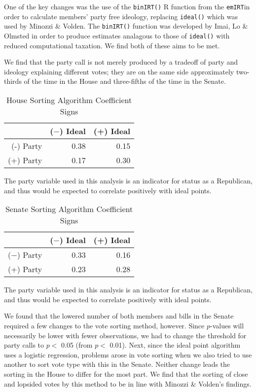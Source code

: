 \documentclass[12pt]{article}
\newcommand\fnote[1]{\captionsetup{font=small}\caption*{#1}}
\begin{document}
One of the key changes was the use of the \verb|binIRT()| R function from the \verb|emIRT|in order to calculate members' party free ideology, replacing \verb|ideal()| which was used by Minozzi \& Volden. The \verb|binIRT()| function was developed by Imai, Lo \& Olmsted in order to produce estimates analagous to those of \verb|ideal()| with reduced computational taxation. We find both of these aims to be met.

We find that the party call is not merely produced by a tradeoff of party and ideology explaining different votes; they are on the same side approximately two-thirds of the time in the House and three-fifths of the time in the Senate.

\begin{table}[H]
	\centering
	\singlespacing
	\caption{House Sorting Algorithm Coefficient Signs}
	\begin{tabular}{rrr}
		\hline
		& ($-$) Ideal & (+) Ideal \\ 
		\hline
		(-) Party & 0.38 & 0.15 \\ 
		(+) Party & 0.17 & 0.30 \\ 
		\hline
	\end{tabular}
\fnote{The party variable used in this analysis is an indicator for status as a Republican, and thus would be expected to correlate positively with ideal points.}
\end{table}

\begin{table}[H]
	\centering
	\singlespacing
	\caption{Senate Sorting Algorithm Coefficient Signs}
	\begin{tabular}{rrr}
		\hline
		& ($-$) Ideal & (+) Ideal \\ 
		\hline
		($-$) Party & 0.33 & 0.16 \\ 
		(+) Party & 0.23 & 0.28 \\ 
		\hline
	\end{tabular}
\fnote{The party variable used in this analysis is an indicator for status as a Republican, and thus would be expected to correlate positively with ideal points.}
\end{table}

We found that the lowered number of both members and bills in the Senate required a few changes to the vote sorting method, however. Since $p$-values will necessarily be lower with fewer observations, we had to change the threshold for party calls to $p <$ 0.05 (from $p <$ 0.01). Next, since the ideal point algorithm uses a logistic regression, problems arose in vote sorting when we also tried to use another to sort vote type with this in the Senate. Neither change leads the sorting in the House to differ for the most part. We find that the sorting of close and lopsided votes by this method to be in line with Minozzi \& Volden's findings.
\end{document}
